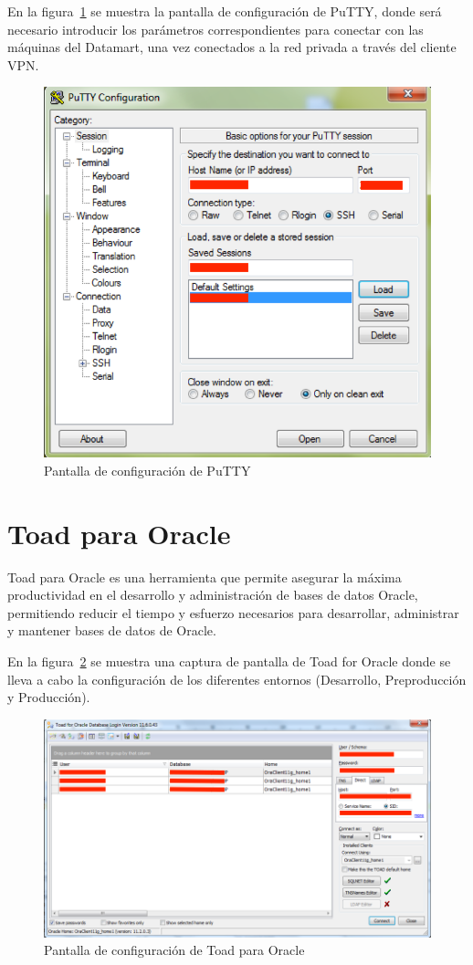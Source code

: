 \documentclass[a4paper, 12pt]{book}
\begin{document}
En la figura~\ref{fig:PuTTY_Config} se muestra la pantalla de configuración de PuTTY, donde será necesario introducir los parámetros correspondientes para conectar con las máquinas del Datamart, una vez conectados a la red privada a través del cliente VPN.

\begin{figure}
   \centering
   \includegraphics[width=12cm, keepaspectratio]{img/puttyconfig}
   \caption{Pantalla de configuración de PuTTY}
   \label{fig:PuTTY_Config}
\end{figure}

\section{Toad para Oracle}
\label{sec:Toad para Oracle}
Toad para Oracle es una herramienta que permite asegurar la máxima productividad en el desarrollo y administración de bases de datos Oracle, permitiendo reducir el tiempo y esfuerzo necesarios para desarrollar, administrar y mantener bases de datos de Oracle.

En la figura~\ref{fig:Toad_Config} se muestra una captura de pantalla de Toad for Oracle donde se lleva a cabo la configuración de los diferentes entornos (Desarrollo, Preproducción y Producción).

\begin{figure}
   \centering
   \includegraphics[width=12cm, keepaspectratio]{img/toadconfig}
   \caption{Pantalla de configuración de Toad para Oracle}
   \label{fig:Toad_Config}
\end{figure}
\end{document}
